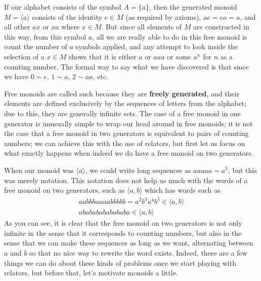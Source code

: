 \documentclass[11pt]{article}
\begin{document}
If our alphabet consists of the symbol $A = \{a \}$, then the generated monoid $M = \langle a \rangle$ consists of the identity $e \in M$ (as required by axioms), $a e = e a = a$, and all other $a x$ or $x a$ where $x \in M$. But since all elements of $M$ are constructed in this way, from this symbol $a$, all we are really able to do in this free monoid is count the number of $a$ symbols applied, and any attempt to look inside the selection of a $x \in M$ shows that it is either $a$ or $aaa$ or some $a^n$ for $n$ as a counting number. The formal way to say what we have discovered is that  since we have $0 \sim e$, $1 \sim a$, $2 \sim aa$, etc.

Free monoids are called such because they are \textbf{freely generated}, and their elements are defined exclusively by the sequences of letters from the alphabet; due to this, they are generally infinite sets. The case of a free monoid in one generator is unusually simple to wrap our head around in free monoids; it is not the case that a free monoid in two generators is equivalent to pairs of counting numbers; we can achieve this with the use of relators, but first let us focus on what exactly happens when indeed we do have a free monoid on two generators.

When our monoid was $\langle a \rangle$, we could write long sequences as $aaaaa=a^5$, but this was merely notation. This notation does not help us much with the words of a free monoid on two generators, such as $\langle a, b \rangle$ which has words such as \begin{gather*}
aabbbaaaabbbbb = a^2 b^3 a ^4 b ^5 \in \langle a, b \rangle\\
abababababababa \in \langle a, b \rangle
\end{gather*}
As you can see, it is clear that the free monoid on two generators is not only infinite in the sense that it corresponds to counting numbers, but also in the sense that we can make these sequences as long as we want, alternating between $a$ and $b$ so that no nice way to rewrite the word exists. Indeed, there are a few things we can do about these kinds of problems once we start playing with relators, but before that, let's motivate monoids a little.
\end{document}
